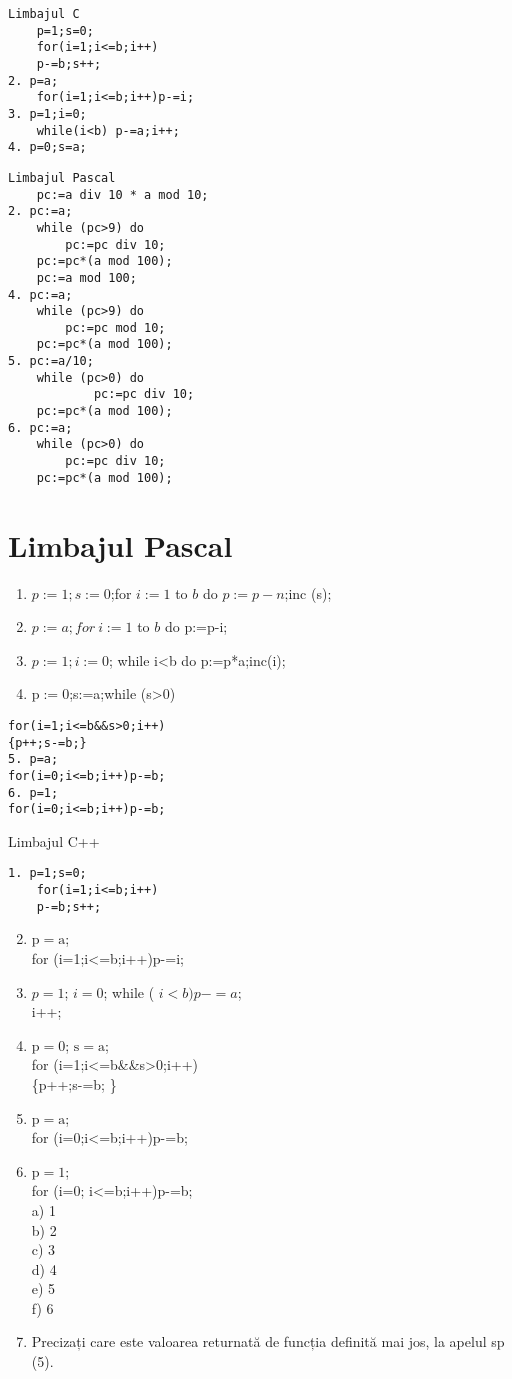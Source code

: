 \begin{verbatim}
Limbajul C
    p=1;s=0;
    for(i=1;i<=b;i++)
    p-=b;s++;
2. p=a;
    for(i=1;i<=b;i++)p-=i;
3. p=1;i=0;
    while(i<b) p-=a;i++;
4. p=0;s=a;
\end{verbatim}

\begin{verbatim}
Limbajul Pascal
    pc:=a div 10 * a mod 10;
2. pc:=a;
    while (pc>9) do
        pc:=pc div 10;
    pc:=pc*(a mod 100);
    pc:=a mod 100;
4. pc:=a;
    while (pc>9) do
        pc:=pc mod 10;
    pc:=pc*(a mod 100);
5. pc:=a/10;
    while (pc>0) do
            pc:=pc div 10;
    pc:=pc*(a mod 100);
6. pc:=a;
    while (pc>0) do
        pc:=pc div 10;
    pc:=pc*(a mod 100);
\end{verbatim}

\section*{Limbajul Pascal}
\begin{enumerate}
  \item $p:=1 ; s:=0$;for $i:=1$ to $b$ do $p:=p-n$;inc (s);
  \item $p:=a ; f o r ~ i:=1$ to $b$ do p:=p-i;
  \item $p:=1 ; i:=0$; while i<b do p:=p*a;inc(i);
  \item $\mathrm{p}:=0$;s:=a;while (s>0)
\end{enumerate}

\begin{verbatim}
for(i=1;i<=b&&s>0;i++)
{p++;s-=b;}
5. p=a;
for(i=0;i<=b;i++)p-=b;
6. p=1;
for(i=0;i<=b;i++)p-=b;
\end{verbatim}

Limbajul C++

\begin{verbatim}
1. p=1;s=0;
    for(i=1;i<=b;i++)
    p-=b;s++;
\end{verbatim}

\begin{enumerate}
  \setcounter{enumi}{1}
  \item $\mathrm{p}=\mathrm{a}$;\\
for (i=1;i<=b;i++)p-=i;
  \item $p=1$; $i=0$; while ( $i<b) p-=a$;\\
i++;
  \item $\mathrm{p}=0$; $\mathrm{s}=\mathrm{a}$;\\
for (i=1;i<=b\&\&s>0;i++)\\
\{p++;s-=b; \}
  \item $\mathrm{p}=\mathrm{a}$;\\
for (i=0;i<=b;i++)p-=b;
  \item $\mathrm{p}=1$;\\
for (i=0; i<=b;i++)p-=b;\\
a) 1\\
b) 2\\
c) 3\\
d) 4\\
e) 5\\
f) 6
  \item Precizați care este valoarea returnată de funcția definită mai jos, la apelul sp (5).
\end{enumerate}

